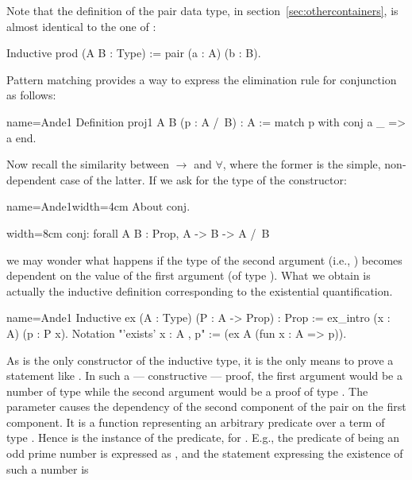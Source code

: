 Note that the definition of the pair data type,
in section~\ref{sec:othercontainers}, is almost identical to the one
of :

\begin{coq}{}{}
Inductive prod (A B : Type) := pair (a : A) (b : B).
\end{coq}

Pattern matching provides a way to express the elimination rule for
conjunction as follows:

\begin{coq}{name=Ande1}{}
Definition proj1 A B (p : A /\ B) : A :=
  match p with conj a _ => a end.
\end{coq}

Now recall the similarity between $\to$ and $\forall$, where the former is the
simple, non-dependent case of the latter.  If we ask for the type of
the  constructor:

\begin{coq-left}{name=Ande1}{width=4cm}
About conj.
\end{coq-left}
\begin{coqout-right}{}{width=8cm}
conj: forall A B : Prop, A -> B -> A /\ B
\end{coqout-right}

we may wonder what happens if the type of the second argument (i.e., )
becomes dependent on the value of the first argument (of type ).
What we obtain is actually the inductive definition corresponding to the
existential quantification.

\begin{coq}{name=Ande1}{}
Inductive ex (A : Type) (P : A -> Prop) : Prop :=
  ex_intro (x : A) (p : P x).
Notation "'exists' x : A , p" := (ex A (fun x : A => p)).
\end{coq}

As   is the only constructor of the  inductive
type, it is the only means to prove a statement like
.  In such a --- constructive --- proof, the first
argument would be a number
 of type  while the second argument would be a proof  of type
.  The parameter  causes the dependency of the
second component of the pair on the first component. It is a function
representing an arbitrary predicate over a term of
type .  Hence  is the instance of the predicate, for .  E.g.,
the predicate of being an odd prime number is expressed as
, and the statement expressing the
existence of such a number is

